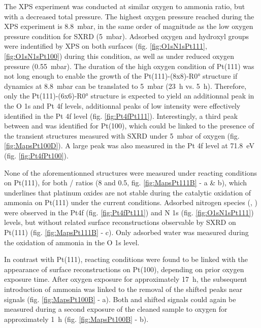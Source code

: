 The XPS experiment was conducted at similar oxygen to ammonia ratio, but with a decreased total pressure.
The highest oxygen pressure reached during the XPS experiment is \qty{8.8}{\milli\bar}, in the same order of magnitude as the low oxygen pressure condition for SXRD (\qty{5}{\milli\bar}).
Adsorbed oxygen and hydroxyl groups were indentified by XPS on both surfaces (fig. \ref{fig:O1sN1sPt111}, \ref{fig:O1sN1sPt100}) during this condition, as well as under reduced oxygen pressure (\qty{0.55}{\milli\bar}).
The duration of the high oxygen condition of Pt(111) was not long enough to enable the growth of the Pt(111)-(8x8)-R\ang{0} structure if dynamics at \qty{8.8}{\milli\bar} can be translated to \qty{5}{\milli\bar} (\qty{23}{\hour} vs. \qty{5}{\hour}).
Therefore, only the Pt(111)-(6x6)-R\ang{0} structure is expected to yield an additionnal peak in the O 1s and Pt 4f levels, additionnal peaks of low intensity were effectively identified in the Pt 4f level (fig. \ref{fig:Pt4fPt111}).
Interestingly, a third peak between  and  was identified for Pt(100), which could be linked to the presence of the transient structures measured with SXRD under \qty{5}{\milli\bar} of oxygen (fig. \ref{fig:MapsPt100D}).
A large peak was also measured in the Pt 4f level at \qty{71.8}{\eV} (fig. \ref{fig:Pt4fPt100}).

None of the aforementionned structures were measured under reacting conditions on Pt(111), for both / ratios (\num{8} and \num{0.5}, fig. \ref{fig:MapsPt111B} - a \& b), which underlines that platinum oxides are not stable during the catalytic oxidation of ammonia on Pt(111) under the current conditions.
Adsorbed nitrogen species (, ) were observed in the Pt4f (fig. \ref{fig:Pt4fPt111}) and N 1s (fig. \ref{fig:O1sN1sPt111}) levels, but without related surface reconstructions observable by SXRD on Pt(111) (fig. \ref{fig:MapsPt111B} - c).
Only adsorbed water was measured during the oxidation of ammonia in the O 1s level.

In contrast with Pt(111), reacting conditions were found to be linked with the appearance of surface reconstructions on Pt(100), depending on prior oxygen exposure time.
After oxygen exposure for approximately \qty{17}{\hour}, the subsequent introduction of ammonia was linked to the removal of the shifted peaks near  signals (fig. \ref{fig:MapsPt100B} - a).
Both  and shifted signals could again be measured during a second exposure of the cleaned sample to oxygen for approximately \qty{1}{\hour} (fig. \ref{fig:MapsPt100B} - b).

